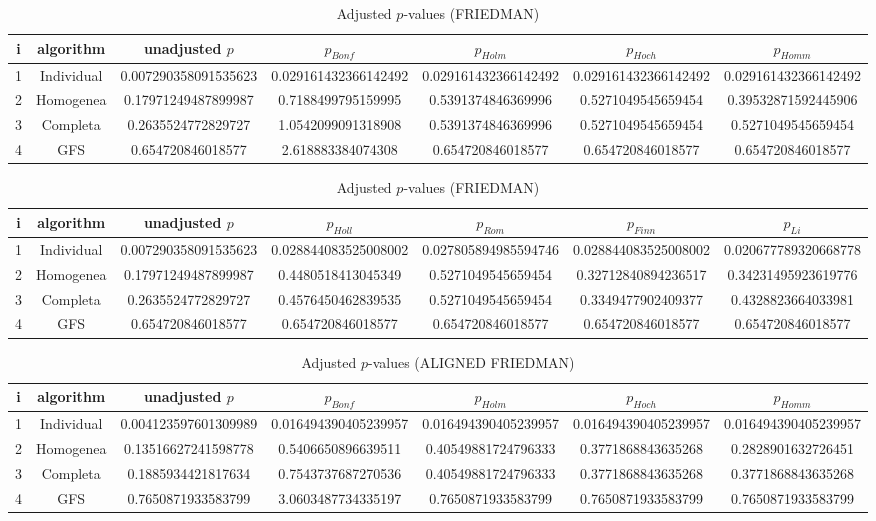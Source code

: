 \documentclass[a4paper,10pt]{article}
\begin{document}
\begin{landscape}
\begin{table}[!htp]
\centering\scriptsize
\caption{Adjusted $p$-values (FRIEDMAN)}
\begin{tabular}{ccccccc}
i&algorithm&unadjusted $p$&$p_{Bonf}$&$p_{Holm}$&$p_{Hoch}$&$p_{Homm}$\\
\hline
1&Individual&0.007290358091535623&0.029161432366142492&0.029161432366142492&0.029161432366142492&0.029161432366142492\\
2&Homogenea&0.17971249487899987&0.7188499795159995&0.5391374846369996&0.5271049545659454&0.39532871592445906\\
3&Completa&0.2635524772829727&1.0542099091318908&0.5391374846369996&0.5271049545659454&0.5271049545659454\\
4&GFS&0.654720846018577&2.618883384074308&0.654720846018577&0.654720846018577&0.654720846018577\\
\hline
\end{tabular}
\end{table}

\begin{table}[!htp]
\centering\scriptsize
\caption{Adjusted $p$-values (FRIEDMAN)}
\begin{tabular}{ccccccc}
i&algorithm&unadjusted $p$&$p_{Holl}$&$p_{Rom}$&$p_{Finn}$&$p_{Li}$\\
\hline
1&Individual&0.007290358091535623&0.028844083525008002&0.027805894985594746&0.028844083525008002&0.020677789320668778\\
2&Homogenea&0.17971249487899987&0.4480518413045349&0.5271049545659454&0.32712840894236517&0.34231495923619776\\
3&Completa&0.2635524772829727&0.4576450462839535&0.5271049545659454&0.3349477902409377&0.4328823664033981\\
4&GFS&0.654720846018577&0.654720846018577&0.654720846018577&0.654720846018577&0.654720846018577\\
\hline
\end{tabular}
\end{table}


\newpage

\begin{table}[!htp]
\centering\scriptsize
\caption{Adjusted $p$-values (ALIGNED FRIEDMAN)}
\begin{tabular}{ccccccc}
i&algorithm&unadjusted $p$&$p_{Bonf}$&$p_{Holm}$&$p_{Hoch}$&$p_{Homm}$\\
\hline
1&Individual&0.004123597601309989&0.016494390405239957&0.016494390405239957&0.016494390405239957&0.016494390405239957\\
2&Homogenea&0.13516627241598778&0.5406650896639511&0.40549881724796333&0.3771868843635268&0.2828901632726451\\
3&Completa&0.1885934421817634&0.7543737687270536&0.40549881724796333&0.3771868843635268&0.3771868843635268\\
4&GFS&0.7650871933583799&3.0603487734335197&0.7650871933583799&0.7650871933583799&0.7650871933583799\\
\hline
\end{tabular}
\end{table}


\end{landscape}
\end{document}
